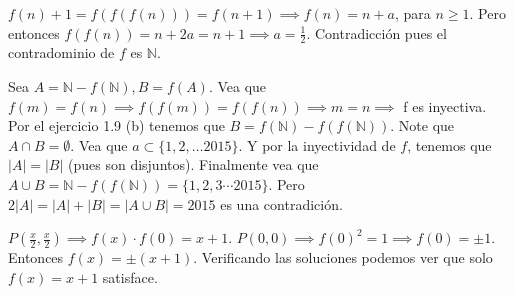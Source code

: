 \begin{sol}
	$f(n) + 1 = f(f(f(n))) = f(n+1)\implies f(n) = n+a$, para $n\geq 1$. Pero entonces $f(f(n)) = n+2a = n+1 \implies a = \frac{1}{2}$. Contradicci\'on pues el contradominio de $f$ es $\mathbb{N}$.  
\end{sol}

\begin{sol}
	Sea $A = \mathbb{N} - f(\mathbb{N}), B = f(A)$. Vea que $f(m) = f(n) \implies f(f(m)) = f(f(n)) \implies m=n \implies$ f es inyectiva. Por el ejercicio 1.9 (b) tenemos que $B = f(\mathbb{N}) - f(f(\mathbb{N}))$. Note que $A \cap B = \emptyset$. Vea que $a \subset \{1, 2, \dots 2015 \}$. Y por la inyectividad de $f$, tenemos que $|A| = |B|$ (pues son disjuntos). Finalmente vea que $A\cup B = \mathbb{N} - f(f(\mathbb{N})) = \{1, 2, 3 \cdots 2015 \}$. Pero $2|A| = |A| + |B| = |A \cup B| = 2015$ es una contradici\'on. 
\end{sol}

\begin{sol}
	$P(\frac{x}{2},\frac{x}{2}) \implies f(x)\cdot f(0) = x+1$. $P(0,0) \implies f(0)^2 = 1 \implies f(0) = \pm 1$. Entonces $f(x) = \pm(x+1)$. Verificando las soluciones podemos ver que solo $f(x) = x+1$ satisface. 
\end{sol}